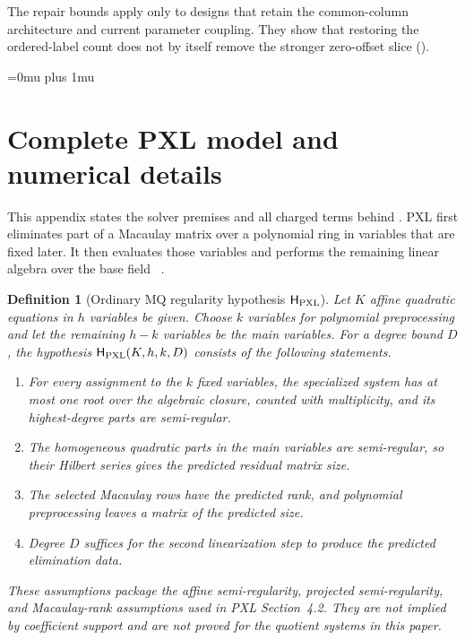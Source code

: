 \documentclass[11pt]{article}
\newtheorem{definition}[definition]{Definition}
\begin{document}
The repair bounds apply only to designs that retain the common-column
architecture and current parameter coupling.  They show that restoring the
ordered-label count does not by itself remove the stronger zero-offset slice
().

\clearpage

\begingroup
\footnotesize
\setlength{\bibsep}{0pt}
\Urlmuskip=0mu plus 1mu\relax
\sloppy

\endgroup

\clearpage
\appendix
\section{Complete PXL model and numerical details}
\label{app:pxl-model}

This appendix states the solver premises and all charged terms behind
.  PXL first eliminates part of a Macaulay matrix
over a polynomial ring in variables that are fixed later.  It then evaluates
those variables and performs the remaining linear algebra over the base field
~\cite{FurueKudo2024PXL}.

\begin{definition}[Ordinary MQ regularity hypothesis $\mathsf H_{\rm PXL}$]
\label{def:pxl-regularity}
Let $K$ affine quadratic equations in $h$ variables be given.  Choose $k$
variables for polynomial preprocessing and let the remaining $h-k$ variables
be the main variables.  For a degree bound $D$, the hypothesis
$\mathsf H_{\rm PXL}(K,h,k,D)$ consists of the following statements.
\begin{enumerate}[label=(\roman*)]
\item For every assignment to the $k$ fixed variables, the specialized
      system has at most one root over the algebraic closure, counted with
      multiplicity, and its highest-degree parts are semi-regular.
\item The homogeneous quadratic parts in the main variables are
      semi-regular, so their Hilbert series gives the predicted residual
      matrix size.
\item The selected Macaulay rows have the predicted rank, and polynomial
      preprocessing leaves a matrix of the predicted size.
\item Degree $D$ suffices for the second linearization step to produce the
      predicted elimination data.
\end{enumerate}
These assumptions package the affine semi-regularity, projected
semi-regularity, and Macaulay-rank assumptions used in PXL Section~4.2.  They
are not implied by coefficient support and are not proved for the quotient
systems in this paper.
\end{definition}
\end{document}
